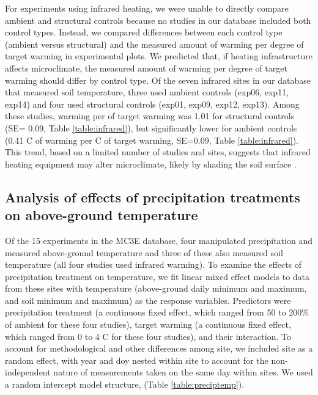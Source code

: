 \documentclass{article}
\begin{document}
\par For experiments using infrared heating, we were unable to directly compare ambient and structural controls because no studies in our database included both control types. Instead, we compared differences between each control type (ambient versus structural) and the measured amount of warming per degree of target warming in experimental plots. We predicted that, if heating infrastructure affects microclimate, the measured amount of warming per degree of target warming should differ by control type. Of the seven infrared sites in our database that measured soil temperature, three used ambient controls (exp06, exp11, exp14) and four used structural controls (exp01, exp09, exp12, exp13).  Among these studies, warming per \degree of target warming was 1.01 for structural controls (SE= 0.09, Table  \ref{table:infrared}), but significantly lower for ambient controls (0.41 \degree C of warming per \degree C of target warming, SE=0.09, Table \ref{table:infrared}). This trend, based on a limited number of studies and sites, suggests that infrared heating equipment may alter microclimate, likely by shading the soil surface \citep{mcdaniel2014}.  

\subsection* {Analysis of effects of precipitation treatments on above-ground temperature}
Of the 15 experiments in the MC3E database, four manipulated precipitation and measured above-ground temperature and three of these also measured soil temperature (all four studies used infrared warming). To examine the effects of precipitation treatment on temperature, we fit linear mixed effect models to data from these sites with temperature (above-ground daily minimum and maximum, and soil minimum and maximum) as the response variables. Predictors were precipitation treatment (a continuous fixed effect, which ranged from 50 to 200\% of ambient for these four studies), target warming (a continuous fixed effect, which ranged from 0 to 4 \degree C for these four studies), and their interaction. To account for methodological and other differences among site, we included site as a random effect, with year and doy nested within site to account for the non-independent nature of measurements taken on the same day within sites. We used a random intercept model structure, (Table \ref{table:preciptemp}). 
\end{document}
